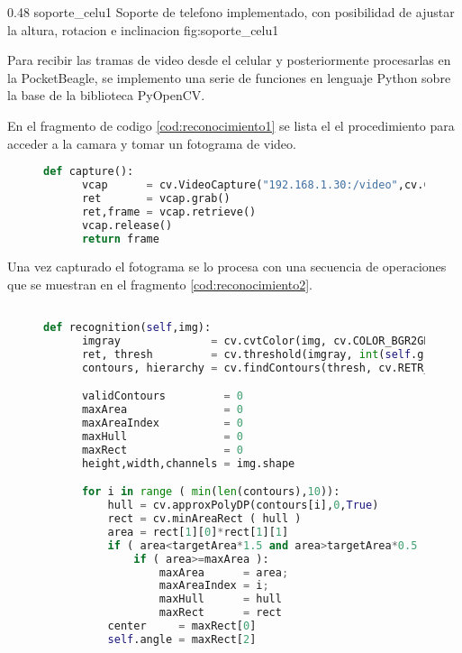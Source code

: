 \subfiga 
      {0.48} 
      {soporte_celu1}
      {Soporte de telefono implementado, con posibilidad de ajustar la altura, rotacion e inclinacion }
      {fig:soporte_celu1}

   Para recibir las tramas de video desde el celular y posteriormente procesarlas en la PocketBeagle, se implemento una serie de funciones en lenguaje Python sobre la base de la biblioteca PyOpenCV. \par
   En el fragmento de codigo \ref{cod:reconocimiento1} se lista el el procedimiento para acceder a la camara y tomar un fotograma de video.\par

\begin{figure}[h]
   \begin{lstlisting}[language=python,caption={Conexion a la camara del telefono por Wi-Fi y captura de un fotograma para su posterior procesamiento.},label={cod:reconocimiento1}]
   def capture():
      vcap      = cv.VideoCapture("192.168.1.30:/video",cv.CAP_FFMPEG);
      ret       = vcap.grab()
      ret,frame = vcap.retrieve()
      vcap.release()
      return frame
   \end{lstlisting}
\end{figure}

Una vez capturado el fotograma se lo procesa con una secuencia de operaciones que se muestran en el fragmento \ref{cod:reconocimiento2}.

\begin{figure}[h]
   \begin{lstlisting}[language=python,caption={Algoritmo principal de reconocimiento de marcas en un fotograma},label={cod:reconocimiento2}]

def recognition(self,img):
      imgray              = cv.cvtColor(img, cv.COLOR_BGR2GRAY)
      ret, thresh         = cv.threshold(imgray, int(self.grayThresh), 0xff, cv.THRESH_BINARY_INV)
      contours, hierarchy = cv.findContours(thresh, cv.RETR_EXTERNAL, cv.CHAIN_APPROX_SIMPLE)

      validContours         = 0
      maxArea               = 0
      maxAreaIndex          = 0
      maxHull               = 0
      maxRect               = 0
      height,width,channels = img.shape

      for i in range ( min(len(contours),10)):
          hull = cv.approxPolyDP(contours[i],0,True) 
          rect = cv.minAreaRect ( hull )
          area = rect[1][0]*rect[1][1]
          if ( area<targetArea*1.5 and area>targetArea*0.5 ):
              if ( area>=maxArea ):
                  maxArea      = area;
                  maxAreaIndex = i;
                  maxHull      = hull
                  maxRect      = rect
          center     = maxRect[0]
          self.angle = maxRect[2]
   \end{lstlisting}
\end{figure}




